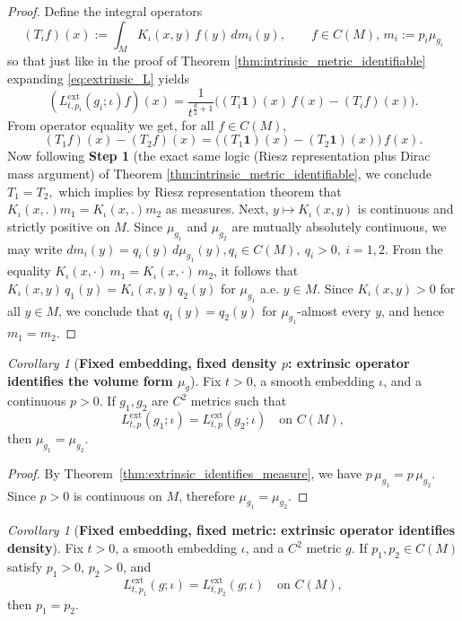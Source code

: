 \documentclass{amsart}
\theoremstyle{definition}
\theoremstyle{remark}
\newtheorem{corollary}[theorem]{Corollary}
\newcommand{\nd}{\noindent}
\newcommand{\0}{\boldsymbol{0}}
\begin{document}
\begin{proof}
Define the integral operators
\[
(T_i f)(x):=\int_M K_\iota(x,y)\,f(y)\,dm_i(y),\qquad f\in C(M), \, m_i:=p_i\mu_{g_i}
\]
so that just like in the proof of Theorem \ref{thm:intrinsic_metric_identifiable} expanding \eqref{eq:extrinsic_L} yields
\[
(L^{\mathrm{ext}}_{t,p_i}(g_i;\iota)f)(x)
=\frac{1}{t^{\frac d2+1}}\Big((T_i\mathbf 1)(x)\,f(x)-(T_i f)(x)\Big).
\]
From operator equality we get, for all $f\in C(M)$,
\[
(T_1 f)(x)-(T_2 f)(x)=\big((T_1\mathbf 1)(x)-(T_2\mathbf 1)(x)\big)\,f(x).
\]
\nd Now following \textbf{Step 1}  (the exact same logic (Riesz representation plus Dirac mass argument) of Theorem \ref{thm:intrinsic_metric_identifiable}, we conclude $T_1=T_2,$ which implies by Riesz representation theorem that $K_{\iota}(x,.)m_1= K_{\iota}(x,.)m_2$ as measures. Next, $y\mapsto K_\iota(x,y)$ is continuous and strictly positive on $M$.
Since $\mu_{g_1}$ and $\mu_{g_2}$ are mutually absolutely continuous, we may write
\(
dm_i(y) = q_i(y)\, d\mu_{g_1}(y), q_i \in C(M), \ q_i>0,\ i=1,2.
\)
From the equality
\(
K_\iota(x,\cdot)\, m_1 = K_\iota(x,\cdot)\, m_2
\),
it follows that
\(
K_\iota(x,y)\, q_1(y) = K_\iota(x,y)\, q_2(y)
\) for $\mu_{g_1}$ a.e. $y\in M$. Since $K_\iota(x,y)>0$ for all $y\in M$, we conclude that $q_1(y)=q_2(y)$ for
$\mu_{g_1}$-almost every $y$, and hence $m_1=m_2$. 
\end{proof}

\begin{corollary}[\textbf{Fixed embedding, fixed density $p$: extrinsic operator identifies the volume form $\mu_g$}]
\label{cor:extrinsic_identifies_volume}
Fix $t>0$, a smooth embedding $\iota$, and a continuous $p>0$.
If $g_1,g_2$ are $C^2$ metrics such that
\[
L^{\mathrm{ext}}_{t,p}(g_1;\iota)=L^{\mathrm{ext}}_{t,p}(g_2;\iota)\quad\text{on }C(M),
\]
then $\mu_{g_1}=\mu_{g_2}$.
\end{corollary}

\begin{proof}
By Theorem~\ref{thm:extrinsic_identifies_measure}, we have $p\,\mu_{g_1}=p\,\mu_{g_2}$.
Since $p>0$ is continuous on $M$, therefore 
$\mu_{g_1}=\mu_{g_2}$.
\end{proof}


\begin{corollary}[\textbf{Fixed embedding, fixed metric: extrinsic operator identifies density}]
\label{cor:extrinsic_identifies_density}
Fix $t>0$, a smooth embedding $\iota$, and a $C^2$ metric $g$.
If $p_1,p_2\in C(M)$ satisfy $p_1>0$, $p_2>0$, and
\[
L^{\mathrm{ext}}_{t,p_1}(g;\iota)=L^{\mathrm{ext}}_{t,p_2}(g;\iota)\quad\text{on }C(M),
\]
then $p_1=p_2$.
\end{corollary}
\end{document}
